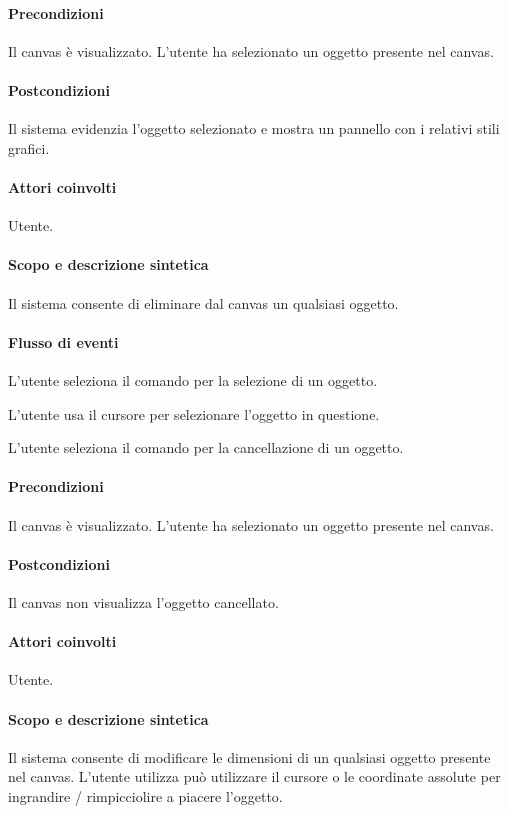 \paragraph{Precondizioni} Il canvas \`e visualizzato. L'utente ha selezionato un oggetto presente nel canvas.
\paragraph{Postcondizioni} Il sistema evidenzia l'oggetto selezionato e mostra un pannello con i relativi stili grafici.

\paragraph{Attori coinvolti} Utente.
\paragraph{Scopo e descrizione sintetica} Il sistema consente di eliminare dal canvas un qualsiasi oggetto.
\paragraph{Flusso di eventi}
\begin{elenconumerato}[\textbf{}]{\subsubsecindent}
\item  L'utente seleziona il comando per la selezione di un oggetto.
\item  L'utente usa il cursore per selezionare l'oggetto in questione.
\item  L'utente seleziona il comando per la cancellazione di un oggetto.
\end{elenconumerato}
\paragraph{Precondizioni} Il canvas \`e visualizzato. L'utente ha selezionato un oggetto presente nel canvas.
\paragraph{Postcondizioni} Il canvas non visualizza l'oggetto cancellato.

\paragraph{Attori coinvolti} Utente.
\paragraph{Scopo e descrizione sintetica}  Il sistema consente di modificare le dimensioni  di un qualsiasi oggetto presente nel canvas.  L'utente utilizza pu\`o utilizzare il cursore o le coordinate assolute per ingrandire / rimpicciolire a piacere l'oggetto.
